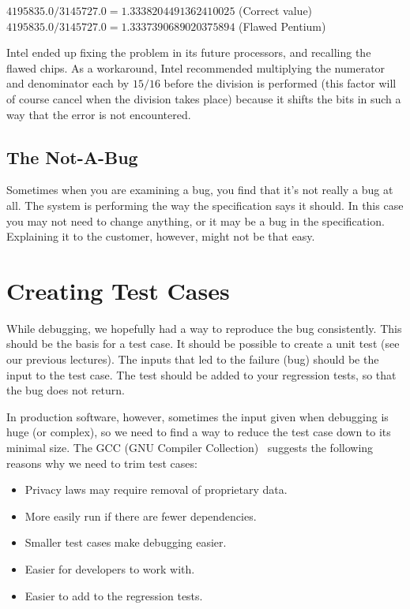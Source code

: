 $4195835.0/3145727.0 = 1.333 820 449 136 241 002 5$  (Correct value)\\
$4195835.0/3145727.0 = 1.333 739 068 902 037 589 4$  (Flawed Pentium)

Intel ended up fixing the problem in its future processors, and recalling the flawed chips. As a workaround, Intel recommended multiplying the numerator and denominator each by $15/16$ before the division is performed (this factor will of course cancel when the division takes place) because it shifts the bits in such a way that the error is not encountered. 


\subsection*{The Not-A-Bug}
Sometimes when you are examining a bug, you find that it's not really a bug at all. The system is performing the way the specification says it should. In this case you may not need to change anything, or it may be a bug in the specification. Explaining it to the customer, however, might not be that easy.

\section*{Creating Test Cases}

While debugging, we hopefully had a way to reproduce the bug consistently. This should be the basis for a test case. It should be possible to create a unit test (see our previous lectures). The inputs that led to the failure (bug) should be the input to the test case. The test should be added to your regression tests, so that the bug does not return. 

In production software, however, sometimes the input given when debugging is huge (or complex), so we need to find a way to reduce the test case down to its minimal size. The GCC (GNU Compiler Collection)~\cite{fsf:bugs} suggests the following reasons why we need to trim test cases:

\begin{itemize}
	\item Privacy laws may require removal of proprietary data.
	\item More easily run if there are fewer dependencies.
	\item Smaller test cases make debugging easier.
	\item Easier for developers to work with.
	\item Easier to add to the regression tests.
\end{itemize}

